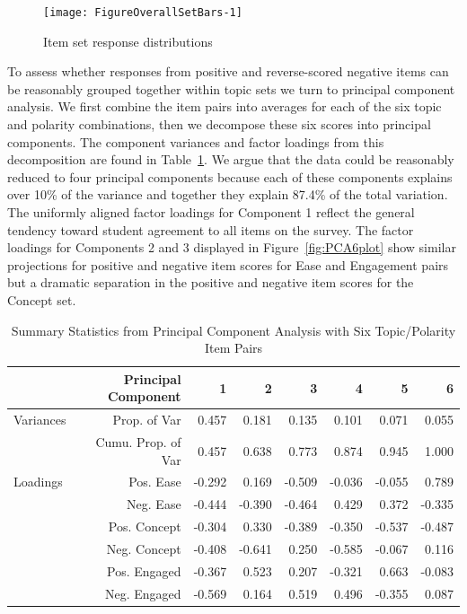 \documentclass[11pt]{isuthesis}\usepackage[]{graphicx}\usepackage[]{color}
\newenvironment{knitrout}{}{} %
\begin{document}
\begin{knitrout}
\color{fgcolor}\begin{figure}[hbt]

{\centering \texttt{[image: FigureOverallSetBars-1]} 

}

\caption[Item set response distributions]{Item set response distributions}\label{fig:OverallSetBars}
\end{figure}


\end{knitrout}


To assess whether responses from positive and reverse-scored negative items can be reasonably grouped together within topic sets we turn to principal component analysis.  We first combine the item pairs into averages for each of the six topic and polarity combinations, then we decompose these six scores into principal components. The component variances and factor loadings from this decomposition are found in Table~\ref{pc6table}. We argue that the data could be reasonably reduced to four principal components because each of these components explains over 10\% of the variance and together they explain 87.4\% of the total variation.  The uniformly aligned factor loadings for Component 1 reflect the general tendency toward student agreement to all items on the survey.  The factor loadings for Components 2 and 3 displayed in Figure~\ref{fig:PCA6plot} show similar projections for positive and negative item scores for Ease and Engagement pairs but a dramatic separation in the positive and negative item scores for the Concept set.  \\  



\begin{table}[hbtp]
\centering
\begin{tabular}{lrrrrrrr}
\hline 
& Principal Component & 1 & 2 & 3 & 4 & 5 & 6 \\ 
\hline
Variances \hspace{.1in} & Prop. of Var & 0.457 & 0.181  & 0.135 & 0.101 & 0.071 & 0.055  \\
& Cumu. Prop. of Var & 0.457 & 0.638  & 0.773 & 0.874 & 0.945 & 1.000  \\
\hline
Loadings & Pos. Ease & -0.292 & 0.169 & -0.509 & -0.036 & -0.055 & 0.789\\
& Neg. Ease &  -0.444 & -0.390 & -0.464 & 0.429 & 0.372 & -0.335\\
& Pos. Concept &  -0.304 & 0.330 & -0.389 & -0.350 & -0.537 & -0.487\\
& Neg. Concept &  -0.408 & -0.641 & 0.250 & -0.585 & -0.067 & 0.116\\
& Pos. Engaged &  -0.367 & 0.523 & 0.207 & -0.321 & 0.663 & -0.083\\
& Neg. Engaged &  -0.569 & 0.164 & 0.519 & 0.496 & -0.355 & 0.087\\
\hline
\end{tabular}
\caption{Summary Statistics from Principal Component Analysis with Six Topic/Polarity Item Pairs} 
\label{pc6table}
\end{table}
\end{document}

